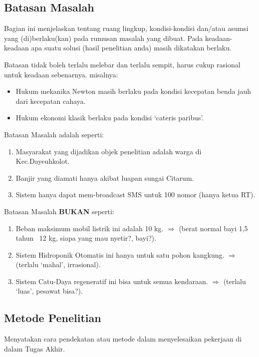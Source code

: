 \documentclass{thesis}
\begin{document}
\subsection{Batasan Masalah}

Bagian ini menjelaskan tentang ruang lingkup, kondisi-kondisi dan/atau asumsi yang (di)berlaku(kan) pada rumusan masalah yang dibuat. Pada keadaan-keadaan apa suatu solusi (hasil penelitian anda) masih dikatakan berlaku.

Batasan tidak boleh terlalu melebar dan terlalu sempit, harus cukup rasional untuk keadaan sebenarnya. misalnya:
\begin{itemize}
    \item Hukum mekanika Newton masih berlaku pada kondisi kecepatan benda jauh dari kecepatan cahaya.
    \item Hukum ekonomi klasik berlaku pada kondisi ‘cateris paribus’.
\end{itemize}

Batasan Masalah adalah seperti:
\begin{enumerate}
    \item Masyarakat yang dijadikan objek penelitian adalah warga di Kec.Dayeuhkolot.
    \item Banjir yang diamati hanya akibat luapan sungai Citarum.
    \item Sistem hanya dapat mem-broadcast SMS untuk 100 nomor (hanya ketua RT).
\end{enumerate}

Batasan Masalah \textbf{BUKAN} seperti:
\begin{enumerate}
    \item Beban maksimum mobil listrik ini adalah 10 kg. $\Rightarrow$ (berat normal bayi 1,5 tahun ~12 kg, siapa yang mau nyetir?, bayi?).
    \item Sistem Hidroponik Otomatis ini hanya untuk satu pohon kangkung. $\Rightarrow$ (terlalu ‘mahal’, irrasional).
    \item Sistem Catu-Daya regeneratif ini bisa untuk semua kendaraan. $\Rightarrow$ (terlalu ‘luas’, pesawat bisa?).
\end{enumerate}

\subsection{Metode Penelitian}

Menyatakan cara pendekatan atau metode dalam menyelesaikan pekerjaan di dalam Tugas Akhir.
\end{document}
